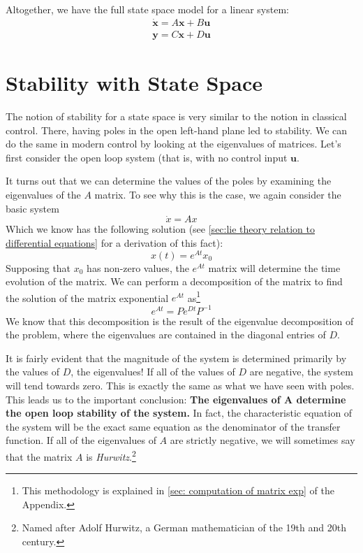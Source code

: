 Altogether, we have the full state space model for a linear system:
\begin{gather}
    \bm{\dot{x}}=A\bm{x}+B\bm{u}\\
    \bm{y}=C\bm{x}+D\bm{u}
\end{gather}

\section{Stability with State Space}

The notion of stability for a state space is very similar to the notion in classical control. There, having poles in the open left-hand plane led to stability. We can do the same in modern control by looking at the eigenvalues of matrices. Let's first consider the open loop system (that is, with no control input $\bm{u}$.

It turns out that we can determine the values of the poles by examining the eigenvalues of the $A$ matrix. To see why this is the case, we again consider the basic system
$$\dot{x}=Ax$$
Which we know has the following solution (see \autoref{sec:lie theory relation to differential equations} for a derivation of this fact):
$$x(t)=e^{At}x_0$$
Supposing that $x_0$ has non-zero values, the $e^{At}$ matrix will determine the time evolution of the matrix. We can perform a decomposition of the matrix to find the solution of the matrix exponential $e^{At}$ as\footnote{This methodology is explained in \autoref{sec: computation of matrix exp} of the Appendix.} $$e^{At}=Pe^{Dt}P^{-1}$$
We know that this decomposition is the result of the eigenvalue decomposition of the problem, where the eigenvalues are contained in the diagonal entries of $D$.

It is fairly evident that the magnitude of the system is determined primarily by the values of $D$, the eigenvalues! If all of the values of $D$ are negative, the system will tend towards zero. This is exactly the same as what we have seen with poles. This leads us to the important conclusion:
\textbf{The eigenvalues of $\textbf{A}$ determine the open loop stability of the system.}
In fact, the characteristic equation of the system will be the exact same equation as the denominator of the transfer function. If all of the eigenvalues of $A$ are strictly negative, we will sometimes say that the matrix $A$ is \textit{Hurwitz}.\footnote{Named after Adolf Hurwitz, a German mathematician of the 19th and 20th century.}

